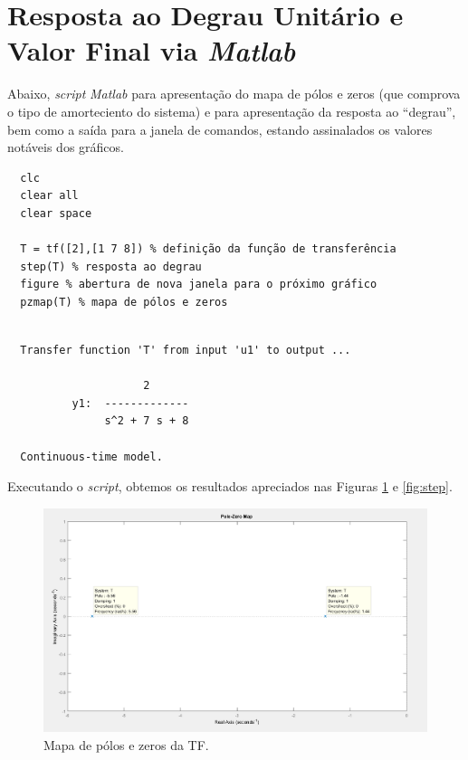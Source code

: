 \documentclass[
	article,			%
	11pt,				%
	oneside,			%
	a4paper,			%
	english,			%
	brazil,				%
	sumario=tradicional
	]{abntex2}
\begin{document}
\newpage

\section{Resposta ao Degrau Unitário e Valor Final via \emph{Matlab}}

Abaixo, \emph{script} \emph{Matlab} para apresentação do mapa de pólos e zeros (que comprova o tipo de amorteciento do sistema) e para apresentação da resposta ao ``degrau'', bem como a saída para a janela de comandos, estando assinalados os valores notáveis dos gráficos.

\begin{verbatim}
  clc
  clear all
  clear space

  T = tf([2],[1 7 8]) % definição da função de transferência
  step(T) % resposta ao degrau
  figure % abertura de nova janela para o próximo gráfico
  pzmap(T) % mapa de pólos e zeros
\end{verbatim}

\begin{verbatim}

  Transfer function 'T' from input 'u1' to output ...

                     2
          y1:  -------------
               s^2 + 7 s + 8

  Continuous-time model.

\end{verbatim}

Executando o \emph{script}, obtemos os resultados apreciados nas Figuras \ref{fig:pzmap} e \ref{fig:step}.

\begin{figure}[b]
  \includegraphics[width=\linewidth, center]{pzmap.png}
  \caption{Mapa de pólos e zeros da TF.}
  \label{fig:pzmap}
\end{figure}
\end{document}
